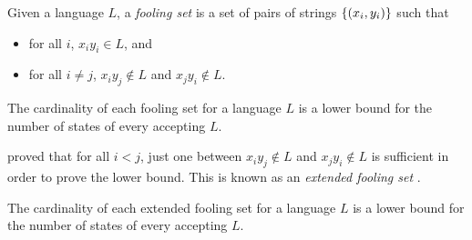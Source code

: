 \begin{defn}
	Given a language $L$, a \emph{fooling set} is a set of pairs of strings $\{(x_i,y_i)\}$ such that
	\begin{itemize}
		\item for all $i$, $x_iy_i\in L$, and
		\item for all $i\ne j$, $x_iy_j\notin L$ and $x_jy_i\notin L$.
	\end{itemize}
\end{defn}
\begin{thrm}
	The cardinality of each fooling set for a language $L$ is a lower bound for the number of states of every \ONFA accepting $L$.
\end{thrm}

\citeauthor{Bir92} proved that for all $i<j$, just one between $x_iy_j\notin L$ and $x_jy_i\notin L$ is sufficient in order to prove the lower bound.
This is known as an \emph{extended fooling set} \cite{Bir92}.
\begin{thrm}
	The cardinality of each extended fooling set for a language $L$ is a lower bound for the number of states of every \ONFA accepting $L$.
\end{thrm}
